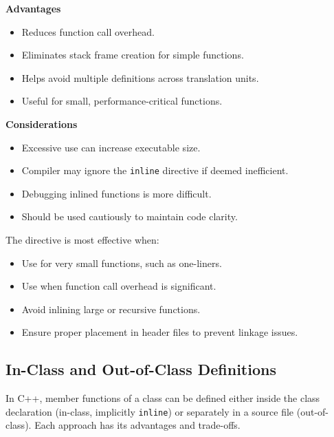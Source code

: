     \textbf{Advantages}
    \begin{itemize}
        \item Reduces function call overhead.
        \item Eliminates stack frame creation for simple functions.
        \item Helps avoid multiple definitions across translation units.
        \item Useful for small, performance-critical functions.
    \end{itemize}
    
    \textbf{Considerations}
    \begin{itemize}
        \item Excessive use can increase executable size.
        \item Compiler may ignore the \texttt{inline} directive if deemed inefficient.
        \item Debugging inlined functions is more difficult.
        \item Should be used cautiously to maintain code clarity.
    \end{itemize}

\begin{tipsblock}

    The  directive is most effective when:

    \begin{itemize}
        \item Use for very small functions, such as one-liners.
        \item Use when function call overhead is significant.
        \item Avoid inlining large or recursive functions.
        \item Ensure proper placement in header files to prevent linkage issues.
    \end{itemize}
\end{tipsblock}

\newpage

\subsection{In-Class and Out-of-Class Definitions}

In C++, member functions of a class can be defined either inside the class declaration (in-class, implicitly \texttt{inline}) or separately in a source file (out-of-class). Each approach has its advantages and trade-offs.

